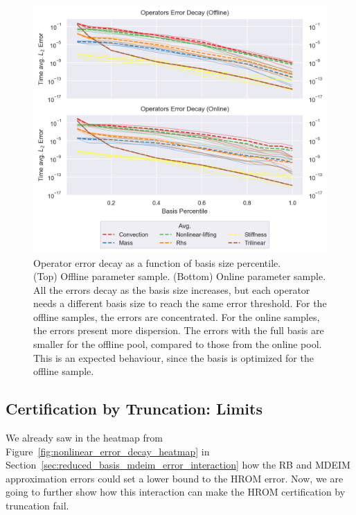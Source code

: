 \documentclass[../../thesis.tex]{subfiles}
\begin{document}
\begin{figure}[h]
    \includegraphics[width =\columnwidth]{research_project/piston/figures/nonlinear_displacement/separable/operators_error_decay_percentile.png}
    \caption{Operator error decay as a function of basis size percentile. \\
    (Top) Offline parameter sample.
    (Bottom) Online parameter sample.
    All the errors decay as the basis size increases, 
    but each operator needs a different basis size to reach the same error threshold.
    For the offline samples, the errors are concentrated.
    For the online samples, the errors present more dispersion.
    The errors with the full basis are smaller for the offline pool, 
    compared to those from the online pool.
    This is an expected behaviour, 
    since the basis is optimized for the offline sample.}
    \label{fig:nlinear_disp_operators_error_decay}
\end{figure}

\newpage
\subsection{Certification by Truncation: Limits}
\label{sec:certification_limits}
We already saw in the heatmap from Figure~\ref{fig:nonlinear_error_decay_heatmap}
in Section~\ref{sec:reduced_basis_mdeim_error_interaction}
how the RB and MDEIM approximation errors could 
set a lower bound to the HROM error.
Now, we are going to further show how this interaction can make 
the HROM certification by truncation fail.
\end{document}
